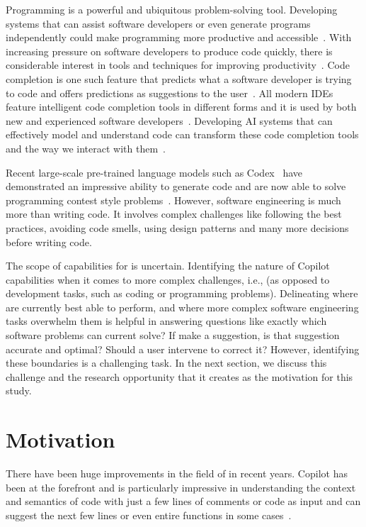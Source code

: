 \label{chapter:introduction}
Programming is a powerful and ubiquitous problem-solving tool. Developing systems that can assist software developers or even generate programs independently could make programming more productive and accessible~\cite{peggyprod}.
With increasing pressure on software developers to produce code quickly, there is considerable interest in tools and techniques for improving productivity~\cite{productivity}.
Code completion is one such feature that predicts what a software developer is trying to code and offers predictions as suggestions to the user~\cite{cct}. All modern IDEs feature intelligent code completion tools in different forms and it is used by both new and experienced software developers~\cite{cct_usage}. Developing AI systems that can effectively model and understand code can transform these code completion tools and the way we interact with them~\cite{cct_usage}.

Recent large-scale pre-trained language models such as Codex~\cite{copilot} have demonstrated an impressive ability to generate code and are now able to solve programming contest style problems~\cite{empirical_eval}. 
However, software engineering is much more than writing code. It involves complex challenges like following the best practices, avoiding code smells, using design patterns and many more decisions before writing code. 

The scope of capabilities for \cct{} is uncertain. Identifying the nature of Copilot capabilities when it comes to more complex challenges, i.e., \AISE{} (as opposed to development tasks, such as coding or programming problems). Delineating where \cct{} are currently best able to perform, and where more complex software engineering tasks overwhelm them is helpful in answering questions like 
exactly which software problems can current \cct{} solve? 
If \cct{} make a suggestion, is that suggestion accurate and optimal? Should a user intervene to correct it? However, identifying these boundaries is a challenging task. In the next section, we discuss this challenge and the research opportunity that it creates as the motivation for this study.

\section{Motivation}
There have been huge improvements in the field of \cct{} in recent years. Copilot has been at the forefront and is particularly impressive in understanding the context and semantics of code with just a few lines of comments or code as input and can suggest the next few lines or even entire functions in some cases~\cite{copilot}.

